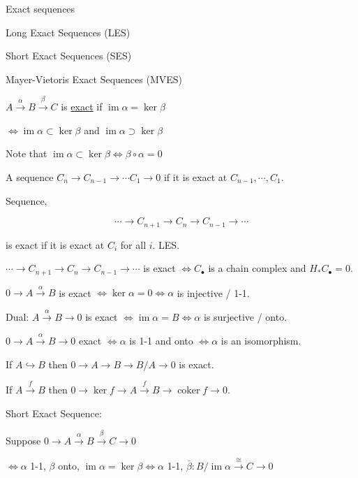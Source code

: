 \documentclass{article}
\theoremstyle{definition}
\begin{document}
    Exact sequences

    Long Exact Sequences (LES)

    Short Exact Sequences (SES)

    Mayer-Vietoris Exact Sequences (MVES)

    \(A \xrightarrow{\alpha} B \xrightarrow{\beta} C\) is \underline{exact} if \(\operatorname{im} \alpha = \ker \beta\) 
    
    \(\iff \operatorname{im} \alpha \subset \ker \beta\) and \(\operatorname{im} \alpha \supset \ker \beta\)

    Note that \(\operatorname{im} \alpha \subset \ker \beta \iff \beta \circ \alpha =0\)

    A sequence \(C_n \to C_{n-1} \to \cdots C_1 \to 0\) if it is exact at \(C_{n-1}, \cdots , C_1\).

    Sequence,

    \[
        \cdots \to C_{n+1} \to C_n \to C_{n-1} \to \cdots 
    \]

    is exact if it is exact at \(C_i\) for all \(i\). LES.

    \(\cdots \to C_{n+1} \to C_n \to C_{n-1} \to \cdots\) is exact \(\iff C_\bullet\) is a chain complex and \(H_{\ast} C_\bullet = 0\).

    \(0 \to A \xrightarrow{\alpha} B\) is exact \(\iff \ker \alpha = 0 \iff \alpha\) is injective / 1-1.
    
    Dual: \( A \xrightarrow{\alpha} B \to 0\) is exact \(\iff \operatorname{im} \alpha = B \iff \alpha\) is surjective / onto.

    \(0 \to A \xrightarrow{\alpha} B \to 0\) exact \(\iff \alpha\) is 1-1 and onto \(\iff \alpha\) is an isomorphism.

    If \(A \hookrightarrow B\) then \(0 \to A \to B \to B / A \to 0\) is exact.

    If \(A \xrightarrow{f} B\) then \(0 \to \ker f \to A \xrightarrow{f} B \to \operatorname{coker} f \to 0\).

    Short Exact Sequence:

    Suppose \(0 \to A \xrightarrow{\alpha} B \xrightarrow{\beta} C \to 0\)

    \(\iff \alpha\) 1-1, \(\beta\) onto, \(\operatorname{im} \alpha = \ker \beta \iff \alpha\) 1-1, \(\overline{\beta} : B / \operatorname{im} \alpha \xrightarrow{\cong} C \to 0\) 

    \begin{center}
    \end{center}
\end{document}
